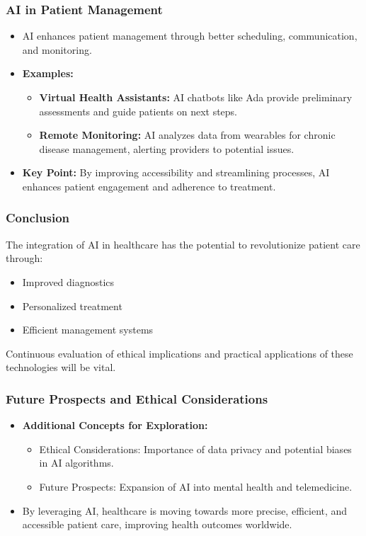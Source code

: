\documentclass[aspectratio=169]{beamer}
\begin{document}
\begin{frame}[fragile]
    \frametitle{AI in Patient Management}
    \begin{itemize}
        \item AI enhances patient management through better scheduling, communication, and monitoring.
        \item \textbf{Examples:}
        \begin{itemize}
            \item \textbf{Virtual Health Assistants:} AI chatbots like Ada provide preliminary assessments and guide patients on next steps.
            \item \textbf{Remote Monitoring:} AI analyzes data from wearables for chronic disease management, alerting providers to potential issues.
        \end{itemize}
        \item \textbf{Key Point:} By improving accessibility and streamlining processes, AI enhances patient engagement and adherence to treatment.
    \end{itemize}
\end{frame}

\begin{frame}[fragile]
    \frametitle{Conclusion}
    The integration of AI in healthcare has the potential to revolutionize patient care through:
    \begin{itemize}
        \item Improved diagnostics
        \item Personalized treatment
        \item Efficient management systems
    \end{itemize}
    Continuous evaluation of ethical implications and practical applications of these technologies will be vital.
\end{frame}

\begin{frame}[fragile]
    \frametitle{Future Prospects and Ethical Considerations}
    \begin{itemize}
        \item \textbf{Additional Concepts for Exploration:}
        \begin{itemize}
            \item Ethical Considerations: Importance of data privacy and potential biases in AI algorithms.
            \item Future Prospects: Expansion of AI into mental health and telemedicine.
        \end{itemize}
        \item By leveraging AI, healthcare is moving towards more precise, efficient, and accessible patient care, improving health outcomes worldwide.
    \end{itemize}
\end{frame}
\end{document}
